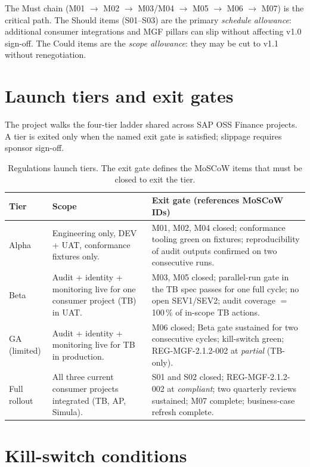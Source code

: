 \documentclass[11pt,a4paper,twoside]{report}
\begin{document}
\noindent
The Must chain (M01 $\to$ M02 $\to$ M03/M04 $\to$ M05 $\to$ M06 $\to$
M07) is the critical path. The Should items (S01--S03) are the
primary \emph{schedule allowance}: additional consumer integrations
and MGF pillars can slip without affecting v1.0 sign-off. The Could
items are the \emph{scope allowance}: they may be cut to v1.1 without
renegotiation.

\section{Launch tiers and exit gates}\label{sec:reg-launch-tiers}

The project walks the four-tier ladder shared across SAP OSS Finance
projects. A tier is exited only when the named exit gate is satisfied;
slippage requires sponsor sign-off.

\begin{table}[htbp]
\centering
\caption{Regulations launch tiers. The exit gate defines the MoSCoW
items that must be closed to exit the tier.}
\label{tab:reg-launch-tiers}
\footnotesize
\begin{tabularx}{\linewidth}{@{}l l X@{}}
\toprule
\textbf{Tier} & \textbf{Scope} & \textbf{Exit gate (references MoSCoW IDs)} \\ \midrule
Alpha & Engineering only, DEV + UAT, conformance fixtures only. & M01, M02, M04 closed; conformance tooling green on fixtures; reproducibility of audit outputs confirmed on two consecutive runs. \\
Beta  & Audit + identity + monitoring live for one consumer project (TB) in UAT. & M03, M05 closed; parallel-run gate in the TB spec passes for one full cycle; no open SEV1/SEV2; audit coverage $=$ 100\,\% of in-scope TB actions. \\
GA (limited) & Audit + identity + monitoring live for TB in production. & M06 closed; Beta gate sustained for two consecutive cycles; kill-switch green; REG-MGF-2.1.2-002 at \textit{partial} (TB-only). \\
Full rollout & All three current consumer projects integrated (TB, AP, Simula). & S01 and S02 closed; REG-MGF-2.1.2-002 at \textit{compliant}; two quarterly reviews sustained; M07 complete; business-case refresh complete. \\
\bottomrule
\end{tabularx}
\end{table}

\section{Kill-switch conditions}\label{sec:reg-kill-switch}
\end{document}
